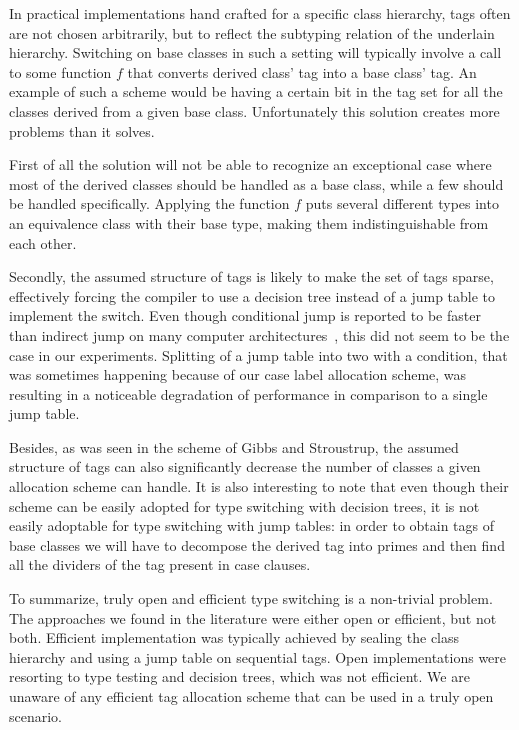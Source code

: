 \documentclass[preprint]{sigplanconf}
\begin{document}
In practical implementations hand crafted for a specific class hierarchy, tags 
often are not chosen arbitrarily, but to reflect the subtyping relation of the 
underlain hierarchy. Switching on base classes in such a setting will typically 
involve a call to some function $f$ that converts derived class' tag into a base 
class' tag. An example of such a scheme would be having a certain bit in the tag 
set for all the classes derived from a given base class. Unfortunately this 
solution creates more problems than it solves.

First of all the solution will not be able to recognize an exceptional case 
where most of the derived classes should be handled as a base class, while a few 
should be handled specifically. Applying the function $f$ puts several different 
types into an equivalence class with their base type, making them 
indistinguishable from each other.

Secondly, the assumed structure of tags is likely to make the set of tags 
sparse, effectively forcing the compiler to use a decision tree instead of a jump 
table to implement the switch. Even though conditional jump is reported to be 
faster than indirect jump on many computer architectures~\cite[]{garrigue-98}, this did not seem to be the case in our experiments. Splitting 
of a jump table into two with a condition, that was sometimes happening because 
of our case label allocation scheme, was resulting in a noticeable degradation of 
performance in comparison to a single jump table.

Besides, as was seen in the scheme of Gibbs and Stroustrup, the assumed 
structure of tags can also significantly decrease the number of classes a given 
allocation scheme can handle. It is also interesting to note that even though 
their scheme can be easily adopted for type switching with decision trees, it is 
not easily adoptable for type switching with jump tables: in order to obtain 
tags of base classes we will have to decompose the derived tag into primes and 
then find all the dividers of the tag present in case clauses.

To summarize, truly open and efficient type switching is a non-trivial problem.
The approaches we found in the literature were either open or efficient, 
but not both. Efficient implementation was typically achieved by sealing the 
class hierarchy and using a jump table on sequential tags. Open implementations 
were resorting to type testing and decision trees, which was not efficient. 
We are unaware of any efficient tag allocation scheme that can be used in a 
truly open scenario.
\end{document}
